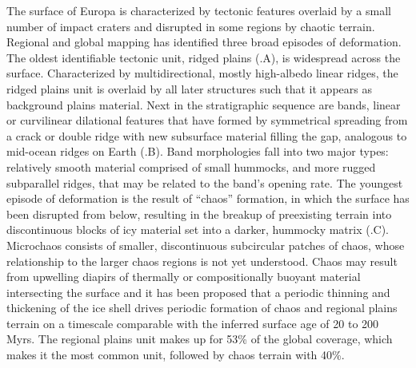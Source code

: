 The surface of Europa is characterized by tectonic features overlaid by a small number of impact craters and disrupted in some regions by chaotic terrain. Regional and global mapping has identified three broad episodes of deformation. The oldest identifiable tectonic unit, ridged plains (.A), is widespread across the surface. Characterized by multidirectional, mostly high-albedo linear ridges, the ridged plains unit is overlaid by all later structures such that it appears as background plains material. Next in the stratigraphic sequence are bands, linear or curvilinear dilational features that have formed by symmetrical spreading from a crack or double ridge with new subsurface material filling the gap, analogous to mid-ocean ridges on Earth (.B). Band morphologies fall into two major types: relatively smooth material comprised of small hummocks, and more rugged subparallel ridges, that may be related to the band’s opening rate. The youngest episode of deformation is the result of ``chaos'' formation, in which the surface has been disrupted from below, resulting in the breakup of preexisting terrain into discontinuous blocks of icy material set into a darker, hummocky matrix (.C). Microchaos consists of smaller, discontinuous subcircular patches of chaos, whose relationship to the larger chaos regions is not yet understood. Chaos may result from upwelling diapirs of thermally or compositionally buoyant material intersecting the surface and it has been proposed that a periodic thinning and thickening of the ice shell drives periodic formation of chaos and regional plains terrain on a timescale comparable with the inferred surface age of 20 to 200 Myrs. The regional plains unit makes up for 53\% of the global coverage, which makes it the most common unit, followed by chaos terrain with 40\%.


